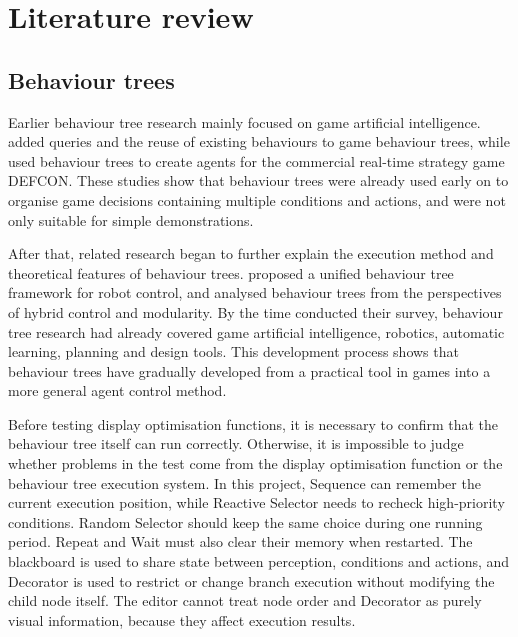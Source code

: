 \chapter{Literature review}

\section{Behaviour trees}

Earlier behaviour tree research mainly focused on game artificial intelligence. \textcite{florezpuga2009query} added queries and the reuse of existing behaviours to game behaviour trees, while \textcite{lim2010evolving} used behaviour trees to create agents for the commercial real-time strategy game DEFCON. These studies show that behaviour trees were already used early on to organise game decisions containing multiple conditions and actions, and were not only suitable for simple demonstrations.

After that, related research began to further explain the execution method and theoretical features of behaviour trees. \textcite{marzinotto2014unified} proposed a unified behaviour tree framework for robot control, and \textcite{colledanchise2017modularize,colledanchise2018book} analysed behaviour trees from the perspectives of hybrid control and modularity. By the time \textcite{iovino2022survey} conducted their survey, behaviour tree research had already covered game artificial intelligence, robotics, automatic learning, planning and design tools. This development process shows that behaviour trees have gradually developed from a practical tool in games into a more general agent control method.

Before testing display optimisation functions, it is necessary to confirm that the behaviour tree itself can run correctly. Otherwise, it is impossible to judge whether problems in the test come from the display optimisation function or the behaviour tree execution system. In this project, Sequence can remember the current execution position, while Reactive Selector needs to recheck high-priority conditions. Random Selector should keep the same choice during one running period. Repeat and Wait must also clear their memory when restarted. The blackboard is used to share state between perception, conditions and actions, and Decorator is used to restrict or change branch execution without modifying the child node itself. The editor cannot treat node order and Decorator as purely visual information, because they affect execution results.

